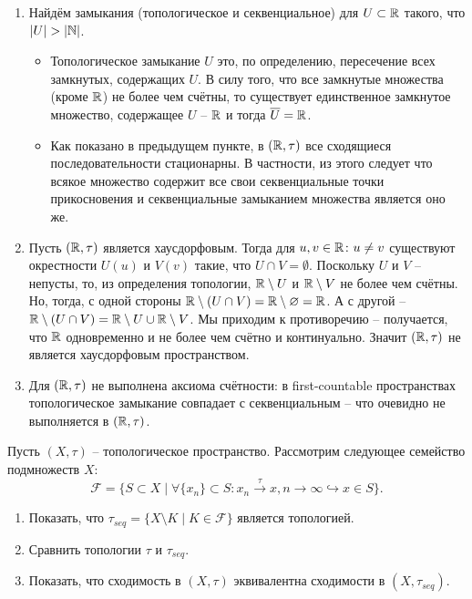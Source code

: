 \begin{solve}
\begin{enumerate}
\begin{itemize}
            Пусть $K \coloneq \{x_n\} \setminus \{x\}$. Множество $K$ -- не более чем счётно, а следовательно его дополнение открыто. Более того -- его дополнение является окрестностью $x$, а значит начиная с какого-то номера $N$ все элементы последовательности лежат в $\R \setminus K$. Это возможно только если $K$ -- конечно и таким образом $\{x_n\}$ -- стационарная последовательность и, в частности, $x \in V$. Значит в $(\R, \tau)$ всякое подмножество $\R$ секвенциально замкнуто.
        \end{itemize}
        \item Найдём замыкания (топологическое и секвенциальное) для $U \subset \mathbb{R}$ такого, что $|U| > |\mathbb{N}|$.
        \begin{itemize}
            \item Топологическое замыкание $U$ это, по определению, пересечение всех замкнутых, содержащих $U$. В силу того, что все замкнутые множества (кроме $\R$) не более чем счётны, то существует единственное замкнутое множество, содержащее $U$ -- $\R$ и тогда $\overline{U} = \mathbb{R}$.
            \item Как показано в предыдущем пункте, в $(\R, \tau)$ все сходящиеся последовательности стационарны. В частности, из этого следует что всякое множество содержит все свои секвенциальные точки прикосновения и секвенциальные замыканием множества является оно же.
        \end{itemize}
        \item Пусть $(\R, \tau)$ является хаусдорфовым. Тогда для $u, v \in \mathbb{R}\colon u \neq v$ существуют окрестности $U(u)$ и $V(v)$ такие, что $U \cap V = \emptyset$. Поскольку $U$ и $V$ -- непусты, то, из определения топологии, $\mathbb{R} \setminus U$ и $\mathbb{R} \setminus V$ не более чем счётны. Но, тогда, с одной стороны $\mathbb{R} \setminus (U \cap V) = \mathbb{R} \setminus \varnothing = \mathbb{R}$. А с другой -- $\mathbb{R} \setminus (U \cap V) = \mathbb{R} \setminus U \cup \mathbb{R} \setminus V$. Мы приходим к противоречию -- получается, что $\R$ одновременно и не более чем счётно и континуально. Значит $(\R, \tau)$ не является хаусдорфовым пространством.
        \item Для $(\R, \tau)$ не выполнена аксиома счётности: в first-countable пространствах топологическое замыкание совпадает с секвенциальным -- что очевидно не выполняется в $(\R, \tau)$.
    \end{enumerate}
\end{solve}
\begin{task}[T2]
    Пусть $(X, \tau)$ -- топологическое пространство. Рассмотрим следующее семейство подмножеств $X\colon$
    \[
        \mathcal{F} = \{S \subset X \mid \forall \{x_n\} \subset S\colon x_n \xrightarrow{\tau} x, n \rightarrow \infty \hookrightarrow x \in S\}.
    \]
    \begin{enumerate}
        \item Показать, что $\tau_{seq} = \{X \setminus K \mid K \in \mathcal{F}\}$ является топологией.
        \item Сравнить топологии $\tau$ и $\tau_{seq}$.
        \item Показать, что сходимость в $(X, \tau)$ эквивалентна сходимости в $(X, \tau_{seq})$.
    \end{enumerate}
\end{task}
